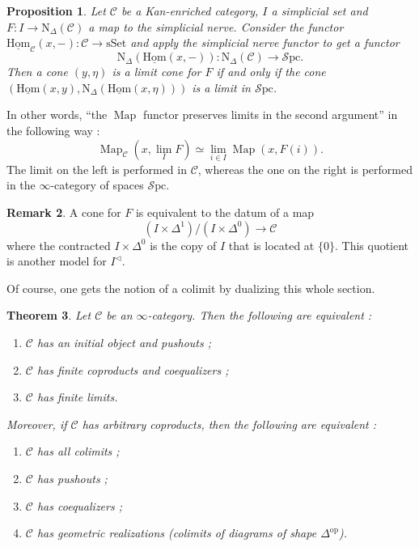 \documentclass[11pt]{article}
\newtheorem{theorem}{Theorem}[section]
\newtheorem{proposition}[theorem]{Proposition}
\theoremstyle{definition}
\newtheorem{remark}[theorem]{Remark}
\newcommand{\C}{\mathcal{C}}
\newcommand{\iHom}{\operatorname{\underline{Hom}}}
\newcommand{\Map}{\operatorname{Map}}
\newcommand{\N}{\mathrm{N}}
\newcommand{\op}{\mathrm{op}}
\newcommand{\Spc}{\mathcal{S}\mathrm{pc}}
\newcommand{\sSet}{\mathrm{sSet}}
\begin{document}
\begin{proposition}
    Let $\C$ be a Kan-enriched category, $I$ a simplicial set and $F : I \to \N_{\Delta}(\C)$ a map to the simplicial nerve.
    Consider the functor $\iHom_{\C}(x, -) : \C \to \sSet$ and apply the simplicial nerve functor to get a functor
    \[
        \N_{\Delta}(\iHom(x, -)) : \N_{\Delta}(\C) \to \Spc.
    \]
    Then a cone $(y, \eta)$ is a limit cone for $F$ if and only if the cone $(\iHom(x, y), \N_{\Delta}(\iHom(x, \eta)))$ is a limit in $\Spc$.
\end{proposition}
In other words, \enquote{the $\Map$ functor preserves limits in the second argument} in the following way :
\[
    \Map_{\C}(x, \lim_I F) \simeq \lim_{i \in I} \Map(x, F(i)).
\]
The limit on the left is performed in $\C$, whereas the one on the right is performed in the $\infty$-category of spaces $\Spc$.

\begin{remark}
    A cone for $F$ is equivalent to the datum of a map
    \[
        (I \times \Delta^1)/(I \times \Delta^0) \to \C
    \]
    where the contracted $I \times \Delta^0$ is the copy of $I$ that is located at $\{0\}$.
    This quotient is another model for $I^{\triangleleft}$.
\end{remark}

Of course, one gets the notion of a colimit by dualizing this whole section.

\begin{theorem}
    Let $\C$ be an $\infty$-category.
    Then the following are equivalent :
    \begin{enumerate}
        \item $\C$ has an initial object and pushouts ;
        \item $\C$ has finite coproducts and coequalizers ;
        \item $\C$ has finite limits.
    \end{enumerate}
    Moreover, if $\C$ has arbitrary coproducts, then the following are equivalent :
    \begin{enumerate}
        \item $\C$ has all colimits ;
        \item $\C$ has pushouts ;
        \item $\C$ has coequalizers ;
        \item $\C$ has geometric realizations (colimits of diagrams of shape $\Delta^{\op}$).
    \end{enumerate}
\end{theorem}
\end{document}
